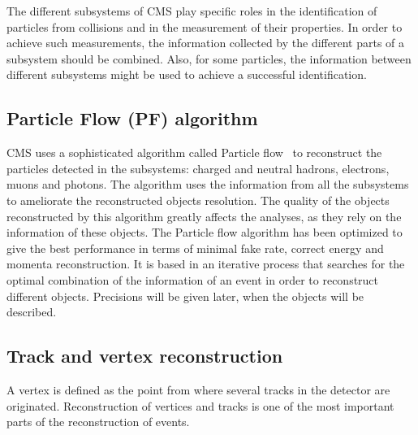 The different subsystems of CMS play specific roles in the identification of particles from collisions and in the measurement of their properties. In order to achieve such measurements, the information collected by the different parts of a subsystem should be combined. Also, for some particles, the information between different subsystems might be used to achieve a successful identification.%

\subsection{Particle Flow (PF) algorithm}

CMS uses a sophisticated algorithm called Particle flow~\cite{CMS:2009nxa,CMS:2010eua,CMS:2010byl,CMS:2010aua} to reconstruct the particles detected in the subsystems: charged and neutral hadrons, electrons, muons and photons. The algorithm uses the information from all the subsystems to ameliorate the reconstructed objects resolution.%
The quality of the objects reconstructed by this algorithm greatly affects the analyses, as they rely on the information of these objects. The Particle flow algorithm has been optimized to give the best performance in terms of minimal fake rate, correct energy and momenta reconstruction. It is based in an iterative process that searches for the optimal combination of the information of an event in order to reconstruct different objects. Precisions will be given later, when the objects will be described.

\subsection{Track and vertex reconstruction}

A vertex is defined as the point from where several tracks in the detector are originated. Reconstruction of vertices and tracks is one of the most important parts of the reconstruction of events.

